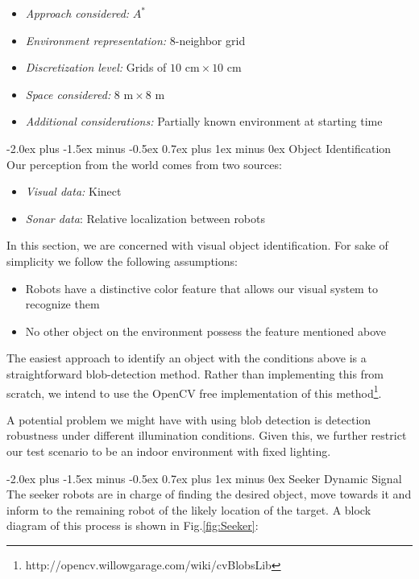 \documentclass[conference]{IEEEtran}
\makeatletter
\renewcommand\subsection{\@startsection{subsection}{1}{\z@}
                                  {-2.0ex plus -1.5ex minus -0.5ex}
                                  {0.7ex plus 1ex minus 0ex}
                                  {\itshape\bfseries}}
\makeatother
\begin{document}
\begin{itemize}
\item{\textit{Approach considered:} $A^{*}$}
\item{\textit{Environment representation:} 8-neighbor grid}
\item{\textit{Discretization level:} Grids of $10\text{ cm} \times 10\text{ cm}$}
\item{\textit{Space considered:} $8\text{ m} \times 8\text{ m}$}
\item{\textit{Additional considerations:} Partially known environment
at starting time}
\end{itemize}

\subsection{Object Identification}
\label{sec:ObjectIdentification}
Our perception from the world comes from two sources:
\begin{itemize}
\item{\textit{Visual data:} Kinect}
\item{\textit{Sonar data}: Relative localization between robots}
\end{itemize}

In this section, we are concerned with visual
object identification. For sake of simplicity
we follow the following assumptions:

\begin{itemize} 
\item{Robots have a distinctive color feature
that allows our visual system to recognize them}
\item{No other object on the environment possess
the feature mentioned above}
\end{itemize}

The easiest approach to identify an object with the
conditions above is a straightforward blob-detection
method. Rather than implementing this from scratch,
we intend to use the OpenCV free implementation of this method\footnote{http://opencv.willowgarage.com/wiki/cvBlobsLib}.
\medskip

A potential problem we might have with using blob
detection is detection robustness under different
illumination conditions. Given this, we further restrict
our test scenario to be an indoor environment with fixed
lighting.

\subsection{Seeker Dynamic Signal}
\label{sec:SeekerDynamicSignal}
The seeker robots are in charge of finding the desired object,
move towards it and inform to the remaining robot
of the likely location of the target. A block diagram of this 
process is shown in Fig.\ref{fig:Seeker}:
\end{document}
